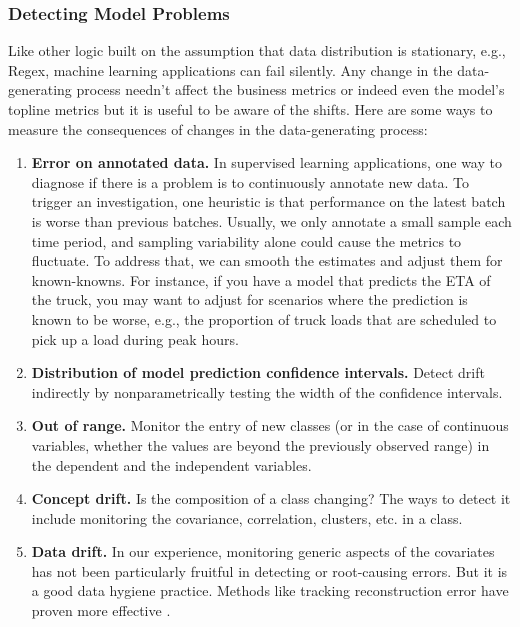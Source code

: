 \documentclass[12pt, letterpaper]{article}
\begin{document}
\subsubsection{Detecting Model Problems}
Like other logic built on the assumption that data distribution is stationary, e.g., Regex, machine learning applications can fail silently. Any change in the data-generating process needn't affect the business metrics or indeed even the model's topline metrics but it is useful to be aware of the shifts. Here are some ways to measure the consequences of changes in the data-generating process: 
\begin{enumerate}

    \item \textbf{Error on annotated data.} In supervised learning applications, one way to diagnose if there is a problem is to continuously annotate new data. To trigger an investigation, one heuristic is that performance on the latest batch is worse than previous batches. Usually, we only annotate a small sample each time period, and sampling variability alone could cause the metrics to fluctuate. To address that, we can smooth the estimates and adjust them for known-knowns. For instance, if you have a model that predicts the ETA of the truck, you may want to adjust for scenarios where the prediction is known to be worse, e.g., the proportion of truck loads that are scheduled to pick up a load during peak hours.
    
    \item \textbf{Distribution of model prediction confidence intervals.} Detect drift indirectly by nonparametrically testing the width of the confidence intervals.
    
    \item \textbf{Out of range.} Monitor the entry of new classes (or in the case of continuous variables, whether the values are beyond the previously observed range) in the dependent and the independent variables. 
    
    \item \textbf{Concept drift.} Is the composition of a class changing? The ways to detect it include monitoring the covariance, correlation, clusters, etc. in a class.
    
    \item \textbf{Data drift.} In our experience, monitoring generic aspects of the covariates has not been particularly fruitful in detecting or root-causing errors. But it is a good data hygiene practice. Methods like tracking reconstruction error have proven more effective \citep{zavrtanik2021reconstruction}.

\end{enumerate}
\end{document}

